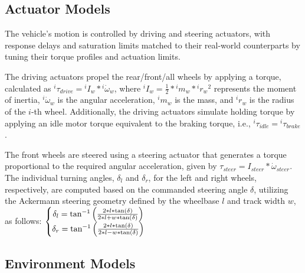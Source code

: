 \documentclass[letterpaper, 10 pt, conference]{ieeeconf}  %
\begin{document}
	\subsection{Actuator Models}
	\label{Sub-Section: Actuator Models}
	
	The vehicle's motion is controlled by driving and steering actuators, with response delays and saturation limits matched to their real-world counterparts by tuning their torque profiles and actuation limits.
	
	The driving actuators propel the rear/front/all wheels by applying a torque, calculated as ${^i\tau_{drive}} = {^iI_w}*{^i\dot{\omega}_w}$, where ${^iI_w} = \frac{1}{2}*{^im_w}*{^i{r_w}^2}$ represents the moment of inertia, $^i\dot{\omega}_w$ is the angular acceleration, $^im_w$ is the mass, and $^ir_w$ is the radius of the $i$-th wheel. Additionally, the driving actuators simulate holding torque by applying an idle motor torque equivalent to the braking torque, i.e., ${^i\tau_{idle}} = {^i\tau_{brake}}$.
	
	The front wheels are steered using a steering actuator that generates a torque proportional to the required angular acceleration, given by $\tau_{steer} = I_{steer}*\dot{\omega}_{steer}$. The individual turning angles, $\delta_l$ and $\delta_r$, for the left and right wheels, respectively, are computed based on the commanded steering angle $\delta$, utilizing the Ackermann steering geometry defined by the wheelbase $l$ and track width $w$, as follows: $\left\{\begin{matrix} \delta_l = \textup{tan}^{-1}\left(\frac{2*l*\textup{tan}(\delta)}{2*l+w*\textup{tan}(\delta)}\right) \\ \delta_r = \textup{tan}^{-1}\left(\frac{2*l*\textup{tan}(\delta)}{2*l-w*\textup{tan}(\delta)}\right) \end{matrix}\right.$
	
	\subsection{Environment Models}
	\label{Sub-Section: Environment Models}
	
\end{document}
